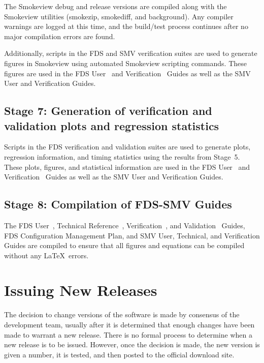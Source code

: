 \documentclass[11pt]{book}
\begin{document}
The Smokeview debug and release versions are compiled along with the Smokeview utilities (smokezip, smokediff, and background). Any compiler warnings are logged at this time, and the build/test process continues after no major compilation errors are found.

Additionally, scripts in the FDS and SMV verification suites are used to generate figures in Smokeview using automated Smokeview scripting commands. These figures are used in the FDS User~\cite{FDS_Users_Guide} and Verification~\cite{FDS_Verification_Guide} Guides as well as the SMV User and Verification Guides.

\subsection*{Stage 7: Generation of verification and validation plots and regression statistics}

Scripts in the FDS verification and validation suites are used to generate plots, regression information, and timing statistics using the results from Stage~5. These plots, figures, and statistical information are used in the FDS User~\cite{FDS_Users_Guide} and Verification~\cite{FDS_Verification_Guide} Guides as well as the SMV User and Verification Guides.

\subsection*{Stage 8: Compilation of FDS-SMV Guides}

The FDS User~\cite{FDS_Users_Guide}, Technical Reference~\cite{FDS_Math_Guide}, Verification~\cite{FDS_Verification_Guide}, and Validation~\cite{FDS_Validation_Guide} Guides, FDS Configuration Management Plan, and SMV User, Technical, and Verification Guides are compiled to ensure that all figures and equations can be compiled without any \LaTeX\ errors.


\section{Issuing New Releases}

The decision to change versions of the software is made by consensus of the development team, usually after it is determined that enough changes have been made to warrant a new release. There is no formal process to determine when a new release is to be issued. However, once the decision is made, the new version is given a number, it is tested, and then posted to the official download site.
\end{document}

